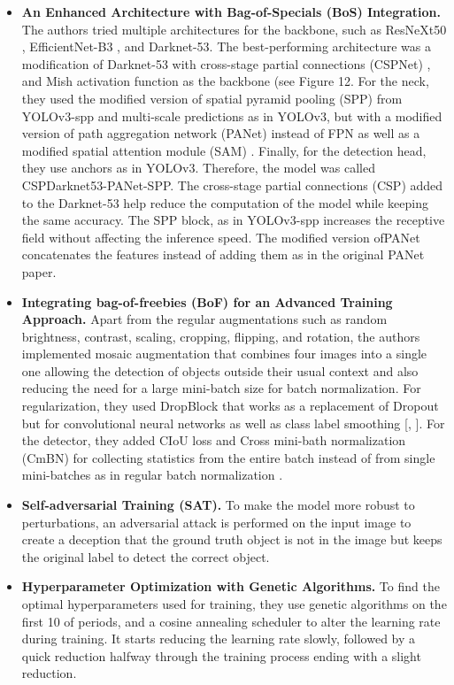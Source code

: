 \documentclass{article}
\begin{document}
\begin{itemize}
    \item \textbf{An Enhanced Architecture with Bag-of-Specials (BoS) Integration.} The authors tried multiple architectures for the backbone, such as ResNeXt50 \cite{xie2017aggregated}, EfficientNet-B3 \cite{tan2019efficientnet}, and Darknet-53. The best-performing architecture was a modification of Darknet-53 with cross-stage partial connections (CSPNet) \cite{wang2020cspnet}, and Mish activation function \cite{misra2019mish} as the backbone (see Figure 12. For the neck, they used the modified version of spatial pyramid pooling (SPP) \cite{he2015spatial} from YOLOv3-spp and multi-scale predictions as in YOLOv3, but with a modified version of path aggregation network (PANet) \cite{liu2018path} instead of FPN as well as a modified spatial attention module (SAM) \cite{woo2018cbam}. Finally, for the detection head, they use anchors as in YOLOv3. Therefore, the model was called CSPDarknet53-PANet-SPP. The cross-stage partial connections (CSP) added to the Darknet-53 help reduce the computation of the model while keeping the same accuracy. The SPP block, as in YOLOv3-spp increases the receptive field without affecting the inference speed. The modified version ofPANet concatenates the features instead of adding them as in the original PANet paper.
    \item \textbf{Integrating bag-of-freebies (BoF) for an Advanced Training Approach.} Apart from the regular augmentations such as random brightness, contrast, scaling, cropping, flipping, and rotation, the authors implemented mosaic augmentation that combines four images into a single one allowing the detection of objects outside their usual context and also reducing the need for a large mini-batch size for batch normalization. For regularization, they used DropBlock \cite{ghiasi2018dropblock} that works as a replacement of Dropout \cite{srivastava2014dropout} but for convolutional neural networks as well as class label smoothing [\cite{szegedy2016rethinking}, \cite{islam2017label}]. For the detector, they added CIoU loss \cite{zheng2020distance} and Cross mini-bath normalization (CmBN) for collecting statistics from the entire batch instead of from single mini-batches as in regular batch normalization \cite{ioffe2015batch}.
    \item \textbf{Self-adversarial Training (SAT).} To make the model more robust to perturbations, an adversarial attack is performed on the input image to create a deception that the ground truth object is not in the image but keeps the original label to detect the correct object.
    \item \textbf{Hyperparameter Optimization with Genetic Algorithms.} To find the optimal hyperparameters used for training, they use genetic algorithms on the first 10 of periods, and a cosine annealing scheduler \cite{loshchilov2016sgdr} to alter the learning rate during training. It starts reducing the learning rate slowly, followed by a quick reduction halfway through the training process ending with a slight reduction.
\end{itemize}
\end{document}
